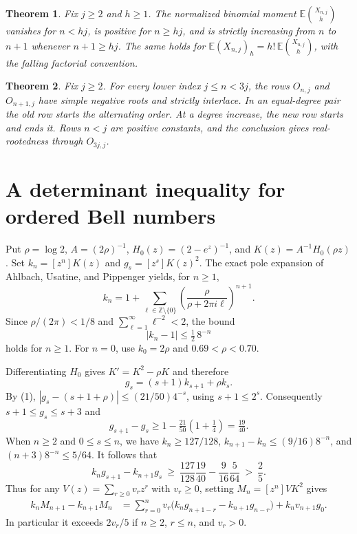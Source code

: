 \documentclass[11pt]{article}
\newtheorem{theorem}{Theorem}
\begin{document}
\begin{theorem}
Fix \(j\ge2\) and \(h\ge1\). The normalized binomial moment \(\mathbb E\binom{X_{n,j}}{h}\) vanishes for \(n<hj\), is positive for \(n\ge hj\), and is strictly increasing from \(n\) to \(n+1\) whenever \(n+1\ge hj\). The same holds for \(\mathbb E(X_{n,j})_h=h!\,\mathbb E\binom{X_{n,j}}h\), with the falling factorial convention.
\end{theorem}

\begin{theorem}
Fix \(j\ge2\). For every lower index \(j\le n<3j\), the rows \(O_{n,j}\) and \(O_{n+1,j}\) have simple negative roots and strictly interlace. In an equal-degree pair the old row starts the alternating order. At a degree increase, the new row starts and ends it. Rows \(n<j\) are positive constants, and the conclusion gives real-rootedness through \(O_{3j,j}\).
\end{theorem}

\section{A determinant inequality for ordered Bell numbers}

Put \(\rho=\log2\), \(A=(2\rho)^{-1}\), \(H_0(z)=(2-e^z)^{-1}\), and \(K(z)=A^{-1}H_0(\rho z)\). Set \(k_n=[z^n]K(z)\) and \(g_s=[z^s]K(z)^2\). The exact pole expansion of Ahlbach, Usatine, and Pippenger \cite[Theorem~14, Eq.~(6)]{aup} yields, for \(n\ge1\),
\[
k_n=1+\sum_{\ell\in\mathbb Z\setminus\{0\}}
     \left(\frac{\rho}{\rho+2\pi i\ell}\right)^{n+1}.
\]
Since \(\rho/(2\pi)<1/8\) and \(\sum_{\ell=1}^\infty\ell^{-2}<2\), the bound
\[
|k_n-1|\le\tfrac12\,8^{-n}
\tag{1}
\]
holds for \(n\ge1\). For \(n=0\), use \(k_0=2\rho\) and \(0.69<\rho<0.70\).

Differentiating \(H_0\) gives \(K'=K^2-\rho K\) and therefore
\[
g_s=(s+1)k_{s+1}+\rho k_s.
\]
By (1), \(|g_s-(s+1+\rho)|\le (21/50)4^{-s}\), using \(s+1\le2^s\). Consequently \(s+1\le g_s\le s+3\) and
\[
g_{s+1}-g_s\ge1-\tfrac{21}{50}(1+\tfrac14)=\tfrac{19}{40}.
\]
When \(n\ge2\) and \(0\le s\le n\), we have \(k_n\ge127/128\), \(k_{n+1}-k_n\le (9/16)8^{-n}\), and \((n+3)8^{-n}\le5/64\). It follows that
\[
k_n g_{s+1}-k_{n+1}g_s
\ \ge\ \frac{127}{128}\frac{19}{40}-\frac9{16}\frac5{64}
\ >\ \frac25 .
\tag{2}
\]
Thus for any \(V(z)=\sum_{r\ge0}v_rz^r\) with \(v_r\ge0\), setting \(M_n=[z^n]VK^2\) gives
\[
\begin{aligned}
k_n M_{n+1}-k_{n+1}M_n
&=\sum_{r=0}^n v_r\bigl(k_n g_{n+1-r}-k_{n+1}g_{n-r}\bigr)
   +k_nv_{n+1}g_0 .
\end{aligned}
\tag{3}
\]
In particular it exceeds \(2v_r/5\) if \(n\ge2\), \(r\le n\), and \(v_r>0\).
\end{document}
